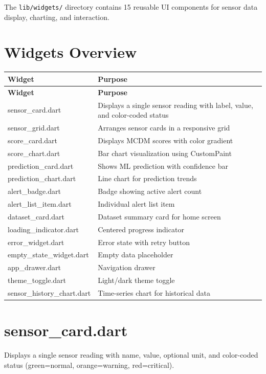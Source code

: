 \documentclass[12pt,a4paper,oneside]{report}
\begin{document}
The \texttt{lib/widgets/} directory contains 15 reusable UI components for sensor data display, charting, and interaction.

\section{Widgets Overview}

\begin{longtable}{p{4cm} p{11cm}}
\toprule
\textbf{Widget} & \textbf{Purpose} \\
\midrule
\endfirsthead
\toprule
\textbf{Widget} & \textbf{Purpose} \\
\midrule
\endhead
\bottomrule
\endfoot
sensor\_card.dart & Displays a single sensor reading with label, value, and color-coded status \\
sensor\_grid.dart & Arranges sensor cards in a responsive grid \\
score\_card.dart & Displays MCDM scores with color gradient \\
score\_chart.dart & Bar chart visualization using CustomPaint \\
prediction\_card.dart & Shows ML prediction with confidence bar \\
prediction\_chart.dart & Line chart for prediction trends \\
alert\_badge.dart & Badge showing active alert count \\
alert\_list\_item.dart & Individual alert list item \\
dataset\_card.dart & Dataset summary card for home screen \\
loading\_indicator.dart & Centered progress indicator \\
error\_widget.dart & Error state with retry button \\
empty\_state\_widget.dart & Empty data placeholder \\
app\_drawer.dart & Navigation drawer \\
theme\_toggle.dart & Light/dark theme toggle \\
sensor\_history\_chart.dart & Time-series chart for historical data \\
\bottomrule
\end{longtable}

\section{sensor\_card.dart}

Displays a single sensor reading with name, value, optional unit, and color-coded status (green=normal, orange=warning, red=critical).
\end{document}
